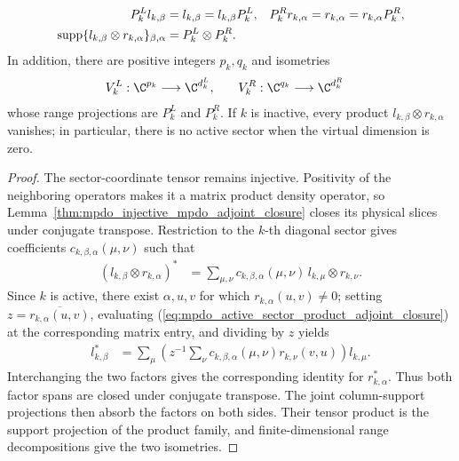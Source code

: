 \begin{lemma}
    \begin{align}
        P_k^L l_{k,\beta}
         & =l_{k,\beta}
        =l_{k,\beta}P_k^L,
         &
        P_k^R r_{k,\alpha}
         & =r_{k,\alpha}
        =r_{k,\alpha}P_k^R,
        \notag                  \\
        \operatorname{supp}
        \{l_{k,\beta}\otimes r_{k,\alpha}\}_{\beta,\alpha}
         & =P_k^L\otimes P_k^R.
        \notag
    \end{align}
    In addition, there are positive integers $p_k,q_k$ and isometries
    \begin{align}
        V_k^L:\C^{p_k}\longrightarrow\C^{d_k^L},
        \qquad &
        V_k^R:\C^{q_k}\longrightarrow\C^{d_k^R}
        \notag
    \end{align}
    whose range projections are $P_k^L$ and $P_k^R$. If $k$ is inactive,
    every product $l_{k,\beta}\otimes r_{k,\alpha}$ vanishes; in particular,
    there is no active sector when the virtual dimension is zero.
\end{lemma}

\begin{proof}
    \leanok
    The sector-coordinate tensor remains injective. Positivity of the
    neighboring operators makes it a matrix product density operator, so
    Lemma~\ref{thm:mpdo_injective_mpdo_adjoint_closure} closes its physical
    slices under conjugate transpose. Restriction to the $k$-th diagonal
    sector gives coefficients $c_{k,\beta,\alpha}(\mu,\nu)$ such that
    \begin{align}
        (l_{k,\beta}\otimes r_{k,\alpha})^*
         & =
        \sum_{\mu,\nu}c_{k,\beta,\alpha}(\mu,\nu)\,
        l_{k,\mu}\otimes r_{k,\nu}.
        \label{eq:mpdo_active_sector_product_adjoint_closure}
    \end{align}
    Since $k$ is active, there exist $\alpha,u,v$ for which
    $r_{k,\alpha}(u,v)\ne0$; setting
    $z=\overline{r_{k,\alpha}(u,v)}$, evaluating
    (\ref{eq:mpdo_active_sector_product_adjoint_closure}) at the corresponding
    matrix entry, and dividing by $z$ yields
    \begin{align}
        l_{k,\beta}^*
         & =
        \sum_\mu
        \left(
        z^{-1}\sum_\nu
        c_{k,\beta,\alpha}(\mu,\nu)r_{k,\nu}(v,u)
        \right)l_{k,\mu}.
    \end{align}
    Interchanging the two factors gives the corresponding identity for
    $r_{k,\alpha}^*$. Thus both factor spans are closed under conjugate
    transpose. The joint column-support projections then absorb the factors
    on both sides. Their tensor product is the support projection of the
    product family, and finite-dimensional range decompositions give the two
    isometries.
\end{proof}

